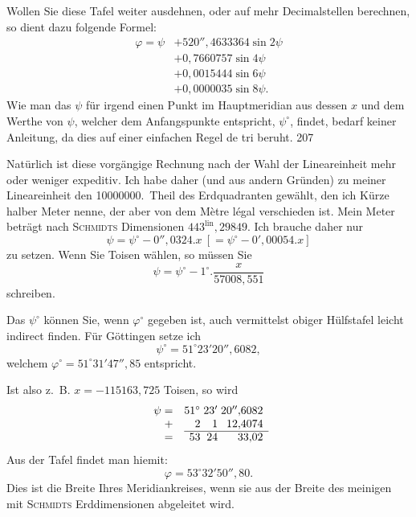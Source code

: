 Wollen Sie diese Tafel weiter ausdehnen, oder auf mehr Decimalstellen berechnen, so dient dazu folgende Formel:
\[
\begin{aligned}
\varphi=\psi&+520''{,}4633364\sin2\psi\\
&+0{,}7660757\sin4\psi\\
&+0{,}0015444\sin6\psi\\
&+0{,}0000035\sin8\psi.
\end{aligned}
\]
Wie man das $\psi$ für irgend einen Punkt im Hauptmeridian aus dessen $x$ und dem Werthe von $\psi$, welcher dem Anfangspunkte entspricht, $\psi^\circ$, findet, bedarf keiner Anleitung, da dies auf einer einfachen Regel de tri beruht.
\clearpage
{}\hfill207\par\medskip
Natürlich ist diese vorgängige Rechnung nach der Wahl der Lineareinheit mehr oder weniger expeditiv. Ich habe daher (und aus andern Gründen) zu meiner Lineareinheit den 10000000.~Theil des Erdquadranten gewählt, den ich Kürze halber Meter nenne, der aber von dem Mètre légal verschieden ist. Mein Meter beträgt nach \textsc{Schmidts} Dimensionen $443^{\mathrm{lin}}{,}29849$. Ich brauche daher nur
\[
\psi=\psi^\circ-0''{,}0324.x\ [=\psi^\circ-0'{,}00054.x]
\]
zu setzen. Wenn Sie Toisen wählen, so müssen Sie
\[
\psi=\psi^\circ-1^\circ.\frac{x}{57008{,}551}
\]
schreiben.

Das $\psi^\circ$ können Sie, wenn $\varphi^\circ$ gegeben ist, auch vermittelst obiger Hülfstafel leicht indirect finden. Für Göttingen setze ich
\[
\psi^\circ=51^\circ23'20''{,}6082,
\]
welchem $\varphi^\circ=51^\circ31'47''{,}85$ entspricht.

Ist also z.~B. $x=-115163{,}725$ Toisen, so wird
\[
\begin{array}{r@{\quad}r@{\;}r@{\;}r}
\psi=&51^\circ&23'&20''{,}6082\\
+&2&1&12{,}4074\\\cline{2-4}
=&53&24&33{,}02
\end{array}
\]
Aus der Tafel findet man hiemit:
\[
\varphi=53^\circ32'50''{,}80.
\]
Dies ist die Breite Ihres Meridiankreises, wenn sie aus der Breite des meinigen mit \textsc{Schmidts} Erddimensionen abgeleitet wird.

